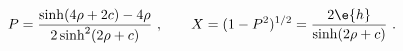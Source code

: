 \begin{equation}
\label{PX}
  P = \frac{\sinh(4\rho+2c)-4\rho}{2\sinh^2(2\rho+c)}~,\qquad 
  X = (1-P^2)^{1/2} = \frac{2 \e{h}}{\sinh(2\rho+c)}~.
\end{equation}

